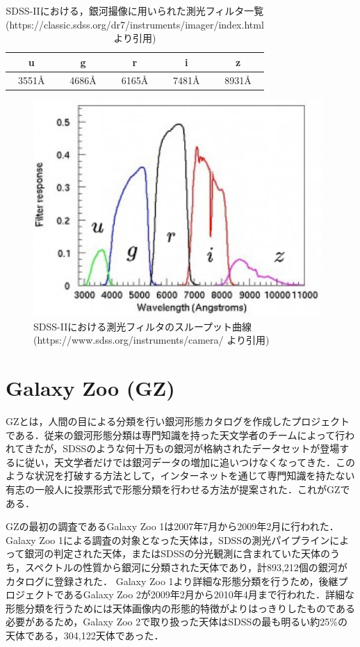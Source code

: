 \documentclass[a4j, 11pt]{jreport}
\begin{document}
\begin{table}[htbp]
  \centering
	\caption{SDSS-IIにおける，銀河撮像に用いられた測光フィルタ一覧\\(https://classic.sdss.org/dr7/instruments/imager/index.html より引用)}
  \begin{tabular}{|c|c|c|c|c|}
		\hline
    u & g & r & i & z \\ \hline
    3551Å & 4686Å & 6165Å & 7481Å & 8931Å \\ \hline
  \end{tabular}
  \label{fig:dr7_filters}
\end{table}


\begin{figure}[H]
 \centering
 \includegraphics[width=11cm]{images/drawio/filter_responces.png}
 \caption{SDSS-IIにおける測光フィルタのスループット曲線\\(https://www.sdss.org/instruments/camera/ より引用)}
 \label{fig:filter_responces}
\end{figure}



\section{Galaxy Zoo (GZ)}
GZ\cite{Lintott2008}とは，人間の目による分類を行い銀河形態カタログを作成したプロジェクトである．従来の銀河形態分類は専門知識を持った天文学者のチームによって行われてきたが，SDSSのような何十万もの銀河が格納されたデータセットが登場するに従い，天文学者だけでは銀河データの増加に追いつけなくなってきた．このような状況を打破する方法として，インターネットを通じて専門知識を持たない有志の一般人に投票形式で形態分類を行わせる方法が提案された．これがGZである．

GZの最初の調査であるGalaxy Zoo 1\cite{Lintott2010}は2007年7月から2009年2月に行われた．Galaxy Zoo 1による調査の対象となった天体は，SDSSの測光パイプラインによって銀河の判定された天体，またはSDSSの分光観測に含まれていた天体のうち，スペクトルの性質から銀河に分類された天体であり，計893,212個の銀河がカタログに登録された．
Galaxy Zoo 1より詳細な形態分類を行うため，後継プロジェクトであるGalaxy Zoo 2\cite{Willett2013}が2009年2月から2010年4月まで行われた．詳細な形態分類を行うためには天体画像内の形態的特徴がよりはっきりしたものである必要があるため，Galaxy Zoo 2で取り扱った天体はSDSSの最も明るい約25\%の天体である，304,122天体であった．
\end{document}
